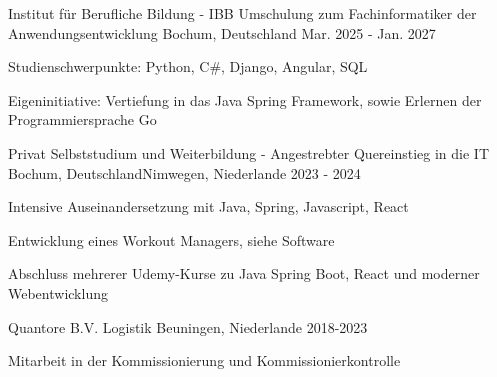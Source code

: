 

\begin{cventries}

  \cventry
  {Institut für Berufliche Bildung - IBB} %
  {Umschulung zum Fachinformatiker der Anwendungsentwicklung} %
  {Bochum, Deutschland} %
  {Mar. 2025 - Jan. 2027} %
  {
    \begin{cvitems} %
      \item {Studienschwerpunkte: Python, C\#, Django, Angular, SQL}
      \item {Eigeninitiative: Vertiefung in das Java Spring Framework, sowie Erlernen der Programmiersprache Go}
    \end{cvitems}
  }

  \cventry
  {Privat} %
  {Selbststudium und Weiterbildung - Angestrebter Quereinstieg in die IT} %
  {\newline Bochum, Deutschland\newline Nimwegen, Niederlande} %
  {2023 - 2024} %
  {
    \begin{cvitems} %
      \item {Intensive Auseinandersetzung mit Java, Spring, Javascript, React}
      \item {Entwicklung eines Workout Managers, siehe Software}
      \item {Abschluss mehrerer Udemy-Kurse zu Java Spring Boot, React und moderner Webentwicklung}
    \end{cvitems}
  }

  \cventry
  {Quantore B.V.} %
  {Logistik} %
  {Beuningen, Niederlande} %
  {2018-2023} %
  {
    \begin{cvitems} %
      \item {Mitarbeit in der Kommissionierung und Kommissionierkontrolle}
    \end{cvitems}
  }



\end{cventries}
